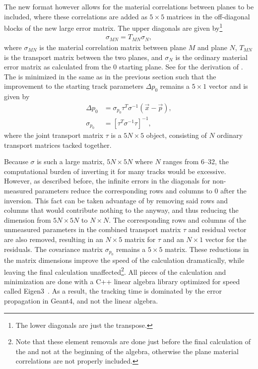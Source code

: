 The new format however allows for the material correlations between planes to be included, where these correlations are added as $5 \times 5$ matrices in the off-diagonal blocks of the new large error matrix. The upper diagonals are given by\footnote{The lower diagonals are just the transpose.} 
    \begin{align} \label{eq:corr}
        \sigma_{MN} = T_{MN} \sigma_{N}, 
    \end{align}
where $\sigma_{MN}$ is the material correlation matrix between plane $M$ and plane $N$, $T_{MN}$ is the transport matrix between the two planes, and $\sigma_{N}$ is the ordinary material error matrix as calculated from the 0 starting plane. See  for the derivation of . The \chisq is minimized in the same as in the previous section such that the improvement to the starting track parameters $\Delta p_{0}$ remains a $5 \times 1$ vector and is given by
    \begin{align} \label{eq:deltafull}
        \Delta p_{0} &= \sigma_{p_{0}} \tau^{T}\sigma^{-1}(\vec{x}-\vec{p}), \\
        \sigma_{p_{0}} &= [\tau^{T} \sigma^{-1} \tau ]^{-1},
    \end{align}
where the joint transport matrix $\tau$ is a $5N \times 5$ object, consisting of $N$ ordinary transport matrices tacked together.




Because $\sigma$ is such a large matrix, $5N \times 5N$ where $N$ ranges from \SIrange{6}{32}{}, the computational burden of inverting it for many tracks would be excessive. However, as described before, the infinite errors in the diagonals for non-measured parameters reduce the corresponding rows and columns to 0 after the inversion. This fact can be taken advantage of by removing said rows and columns that would contribute nothing to the \chisq anyway, and thus reducing the dimension from $5N \times 5N$ to $N \times N$. The corresponding rows and columns of the unmeasured parameters in the combined transport matrix $\tau$ and residual vector are also removed, resulting in an $N \times 5$ matrix for $\tau$ and an $N \times 1$ vector for the residuals. The covariance matrix $\sigma_{p_{0}}$ remains a $5 \times 5$ matrix. These reductions in the matrix dimensions improve the speed of the \chisq calculation dramatically, while leaving the final calculation unaffected\footnote{Note that these element removals are done just before the final calculation of the \chisq and not at the beginning of the algebra, otherwise the plane material correlations are not properly included.}. All pieces of the \chisq calculation and minimization are done with a C++ linear algebra library optimized for speed called Eigen3~\cite{eigenweb}. As a result, the tracking time is dominated by the error propagation in Geant4, and not the linear algebra.

